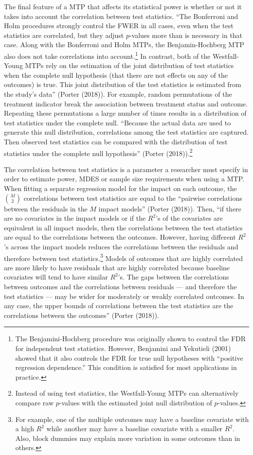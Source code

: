 \documentclass{article}
\begin{document}
The final feature of a MTP that affects its statistical power is whether
or not it takes into account the correlation between test statistics.
``The Bonferroni and Holm procedures strongly control the FWER in all
cases, even when the test statistics are correlated, but they adjust
\(p\)-values more than is necessary in that case. Along with the
Bonferroni and Holm MTPs, the Benjamin-Hochberg MTP also does not take
correlations into account.\footnote{The Benjamini-Hochberg procedure was
  originally shown to control the FDR for independent test statistics.
  However, Benjamini and Yekutieli (2001) showed that it also controls
  the FDR for true null hypotheses with ``positive regression
  dependence.'' This condition is satisfied for most applications in
  practice.} In contrast, both of the Westfall-Young MTPs rely on the
estimation of the joint distribution of test statistics when the
complete null hypothesis (that there are not effects on any of the
outcomes) is true. This joint distribution of the test statistics is
estimated from the study's data'' (Porter (2018)). For example, random
permutations of the treatment indicator break the association between
treatment status and outcome. Repeating these permutations a large
number of times results in a distribution of test statistics under the
complete null. ``Because the actual data are used to generate this null
distribution, correlations among the test statistics are captured. Then
observed test statistics can be compared with the distribution of test
statistics under the complete null hypothesis'' (Porter
(2018)).\footnote{Instead of using test statistics, the Westfall-Young
  MTPs can alternatively compare raw \(p\)-values with the estimated
  joint null distribution of \(p\)-values.}

The correlation between test statistics is a parameter a researcher must
specify in order to estimate power, MDES or sample size requirements
when using a MTP. When fitting a separate regression model for the
impact on each outcome, the \(\binom{M}{2}\) correlations between test
statistics are equal to the ``pairwise correlations between the
residuals in the \(M\) impact models'' (Porter (2018)). Then, ``if there
are no covariates in the impact models or if the \(R^2\)'s of the
covariates are equivalent in all impact models, then the correlations
between the test statistics are equal to the correlations between the
outcomes. However, having different \(R^2\)'s across the impact models
reduces the correlations between the residuals and therefore between
test statistics.\footnote{For example, one of the multiple outcomes may
  have a baseline covariate with a high \(R^2\) while another may have a
  baseline covariate with a smaller \(R^2\). Also, block dummies may
  explain more variation in some outcomes than in others.} Models of
outcomes that are highly correlated are more likely to have residuals
that are highly correlated because baseline covariates will tend to have
similar \(R^2\)'s. The gaps between the correlations between outcomes
and the correlations between residuals --- and therefore the test
statistics --- may be wider for moderately or weakly correlated
outcomes. In any case, the upper bounds of correlations between the test
statistics are the correlations between the outcomes'' (Porter (2018)).
\end{document}
